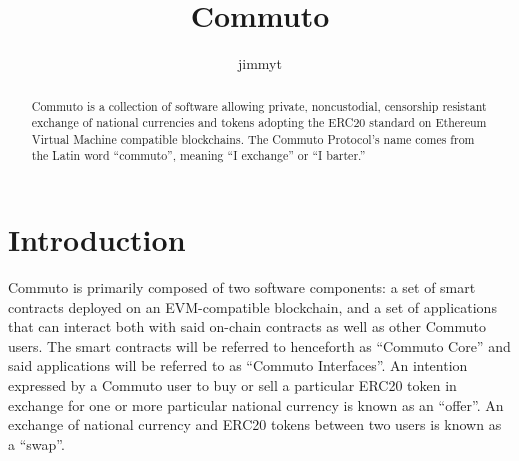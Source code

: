 \documentclass[11pt]{article}
\author{jimmyt}
\begin{document}
    \title{Commuto}
    \maketitle

    \begin{abstract}
        Commuto is a collection of software allowing private, noncustodial, censorship resistant
        exchange of national currencies and tokens adopting the ERC20\cite{ERC20} standard on
        Ethereum Virtual Machine\cite{Ethereum} compatible blockchains.
        The Commuto Protocol's name comes from the Latin word ``commuto'', meaning ``I exchange'' or
        ``I barter.''
    \end{abstract}

    \section*{Introduction}

        Commuto is primarily composed of two software components: a set of smart contracts deployed
        on an EVM-compatible blockchain, and a set of applications that can interact both with said
        on-chain contracts as well as other Commuto users.
        The smart contracts will be referred to henceforth as ``Commuto Core'' and said applications
        will be referred to as ``Commuto Interfaces''.
        An intention expressed by a Commuto user to buy or sell a particular ERC20 token in exchange
        for one or more particular national currency is known as an ``offer''.
        An exchange of national currency and ERC20 tokens between two users is known as a ``swap''.
\end{document}
